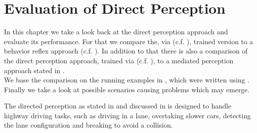 \chapter{Evaluation of Direct Perception}

In this chapter we take a look back at the direct perception approach and evaluate its performance. For that we compare the, via \torcs (c.f. ), trained version to a behavior reflex approach (c.f. ). In addition to that there is also a comparison of the direct perception approach, trained via \kitti (c.f. ), to a mediated perception approach stated in \cite{geiger20143d}.\\
We base the comparison on the running examples in \cite{DeepDriving}, which were written using \caffe.\\
Finally we take a look at possible scenarios causing problems which may emerge. 

The directed perception as stated in \cite{chen2015deepdriving} and discussed in  is designed to handle highway driving tasks, such as driving in a lane, overtaking slower cars, detecting the lane configuration and breaking to avoid a collision.


